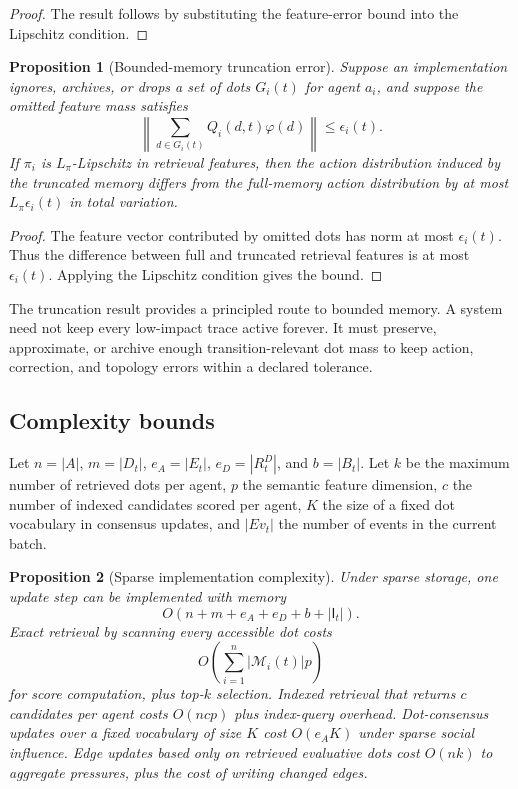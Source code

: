 \documentclass[11pt]{article}
\newtheorem{proposition}{Proposition}
\theoremstyle{remark}
\begin{document}
\begin{proof}
The result follows by substituting the feature-error bound into the
Lipschitz condition.
\end{proof}

\begin{proposition}[Bounded-memory truncation error]\label{prop:bounded-memory-truncation-error}
Suppose an implementation ignores, archives, or drops a set of dots
$G_i(t)$ for agent $a_i$, and suppose the omitted feature mass satisfies
$$
\left\|\sum_{d\in G_i(t)}Q_i(d,t)\varphi(d)\right\|\leq\epsilon_i(t).
$$
If $\pi_i$ is $L_\pi$-Lipschitz in retrieval features, then the action
distribution induced by the truncated memory differs from the full-memory
action distribution by at most $L_\pi\epsilon_i(t)$ in total variation.
\end{proposition}

\begin{proof}
The feature vector contributed by omitted dots has norm at most
$\epsilon_i(t)$. Thus the difference between full and truncated retrieval
features is at most $\epsilon_i(t)$. Applying the Lipschitz condition
gives the bound.
\end{proof}

The truncation result provides a principled route to bounded memory. A
system need not keep every low-impact trace active forever. It must
preserve, approximate, or archive enough transition-relevant dot mass to
keep action, correction, and topology errors within a declared tolerance.

\subsection{Complexity bounds}\label{complexity-bounds}

Let $n=|A|$, $m=|D_t|$, $e_A=|E_t|$, $e_D=|R_t^D|$, and $b=|B_t|$. Let
$k$ be the maximum number of retrieved dots per agent, $p$ the semantic
feature dimension, $c$ the number of indexed candidates scored per
agent, $K$ the size of a fixed dot vocabulary in consensus updates, and
$|Ev_t|$ the number of events in the current batch.

\begin{proposition}[Sparse implementation complexity]\label{prop:sparse-implementation-complexity}
Under sparse storage, one update step can be implemented with memory
$$
O(n+m+e_A+e_D+b+|\mathsf I_t|).
$$
Exact retrieval by scanning every accessible dot costs
$$
O\left(\sum_{i=1}^n |\mathcal M_i(t)|p\right)
$$
for score computation, plus top-$k$ selection. Indexed retrieval that
returns $c$ candidates per agent costs $O(ncp)$ plus index-query
overhead. Dot-consensus updates over a fixed vocabulary of size $K$ cost
$O(e_AK)$ under sparse social influence. Edge updates based only on
retrieved evaluative dots cost $O(nk)$ to aggregate pressures, plus the
cost of writing changed edges.
\end{proposition}
\end{document}

